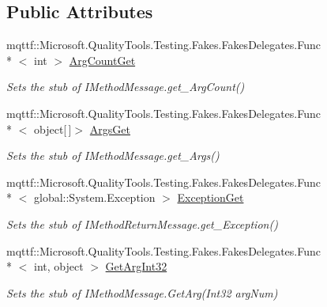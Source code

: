 \subsection*{Public Attributes}
\begin{DoxyCompactItemize}
\item 
mqttf\-::\-Microsoft.\-Quality\-Tools.\-Testing.\-Fakes.\-Fakes\-Delegates.\-Func\\*
$<$ int $>$ \hyperlink{class_system_1_1_runtime_1_1_remoting_1_1_activation_1_1_fakes_1_1_stub_i_construction_return_message_a120f979613c10e0b2a8faa56ce710f98}{Arg\-Count\-Get}
\begin{DoxyCompactList}\small\item\em Sets the stub of I\-Method\-Message.\-get\-\_\-\-Arg\-Count()\end{DoxyCompactList}\item 
mqttf\-::\-Microsoft.\-Quality\-Tools.\-Testing.\-Fakes.\-Fakes\-Delegates.\-Func\\*
$<$ object\mbox{[}$\,$\mbox{]}$>$ \hyperlink{class_system_1_1_runtime_1_1_remoting_1_1_activation_1_1_fakes_1_1_stub_i_construction_return_message_afadecb9b22dcf41c29f775c133f77d27}{Args\-Get}
\begin{DoxyCompactList}\small\item\em Sets the stub of I\-Method\-Message.\-get\-\_\-\-Args()\end{DoxyCompactList}\item 
mqttf\-::\-Microsoft.\-Quality\-Tools.\-Testing.\-Fakes.\-Fakes\-Delegates.\-Func\\*
$<$ global\-::\-System.\-Exception $>$ \hyperlink{class_system_1_1_runtime_1_1_remoting_1_1_activation_1_1_fakes_1_1_stub_i_construction_return_message_a8777eb4cb3f50768d7dae859e575b475}{Exception\-Get}
\begin{DoxyCompactList}\small\item\em Sets the stub of I\-Method\-Return\-Message.\-get\-\_\-\-Exception()\end{DoxyCompactList}\item 
mqttf\-::\-Microsoft.\-Quality\-Tools.\-Testing.\-Fakes.\-Fakes\-Delegates.\-Func\\*
$<$ int, object $>$ \hyperlink{class_system_1_1_runtime_1_1_remoting_1_1_activation_1_1_fakes_1_1_stub_i_construction_return_message_a9bdc2709685d0d468b487b1ba503a108}{Get\-Arg\-Int32}
\begin{DoxyCompactList}\small\item\em Sets the stub of I\-Method\-Message.\-Get\-Arg(\-Int32 arg\-Num)\end{DoxyCompactList}\item 

\end{DoxyCompactItemize}
